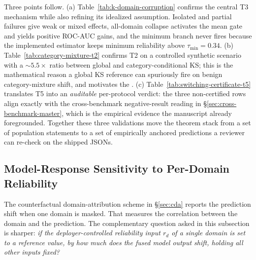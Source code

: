 \documentclass[10pt,conference]{IEEEtran}
\begin{document}

Three points follow. (a) Table~\ref{tab:k-domain-corruption} confirms the
central T3 mechanism while also refining its idealized assumption. Isolated
and partial failures give weak or mixed effects, all-domain collapse activates
the mean gate and yields positive ROC-AUC gains, and the minimum branch never
fires because the implemented estimator keeps minimum reliability above
$\tau_{\min}=0.34$. (b)
Table~\ref{tab:category-mixture-t2} confirms T2 on a controlled
synthetic scenario with a $\sim$$5.5\times$ ratio between global and
category-conditional KS; this is the mathematical reason a global KS
reference can spuriously fire on benign category-mixture shift, and
motivates the . (c)
Table~\ref{tab:switching-certificate-t5} translates T5 into an
\emph{auditable} per-protocol verdict: the three non-certified rows
align exactly with the cross-benchmark negative-result reading in
§\ref{sec:cross-benchmark-master}, which is the empirical evidence
the manuscript already foregrounded. Together these three validations
move the theorem stack from a set of population statements to a set
of empirically anchored predictions a reviewer can re-check on the
shipped JSONs.

\subsection{Model-Response Sensitivity to Per-Domain Reliability}
\label{sec:causal-attribution}

The counterfactual domain-attribution scheme in §\ref{sec:cda} reports
the prediction shift when one domain is masked. That measures the
correlation between the domain and the prediction. The complementary
question asked in this subsection is sharper: \emph{if the
deployer-controlled reliability input $r_d$ of a single domain is set
to a reference value, by how much does the fused model output shift,
holding all other inputs fixed?}
\end{document}
